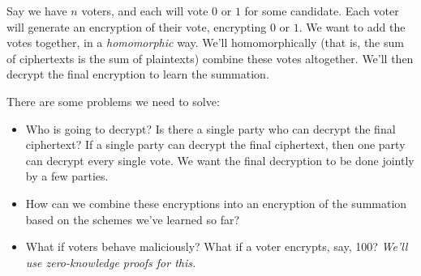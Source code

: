 Say we have $n$ voters, and each will vote $0$ or $1$ for some candidate. Each voter will generate an encryption of their vote, encrypting $0$ or $1$. We want to add the votes together, in a \emph{homomorphic} way. We'll homomorphically (that is, the sum of ciphertexts is the sum of plaintexts) combine these votes altogether. We'll then decrypt the final encryption to learn the summation.

There are some problems we need to solve:
\begin{itemize}
    \item Who is going to decrypt? Is there a single party who can decrypt the final ciphertext? If a single party can decrypt the final ciphertext, then one party can decrypt every single vote. We want the final decryption to be done jointly by a few parties.
    \item How can we combine these encryptions into an encryption of the summation based on the schemes we've learned so far?
    \item What if voters behave maliciously? What if a voter encrypts, say, 100? \emph{We'll use zero-knowledge proofs for this.}
\end{itemize}